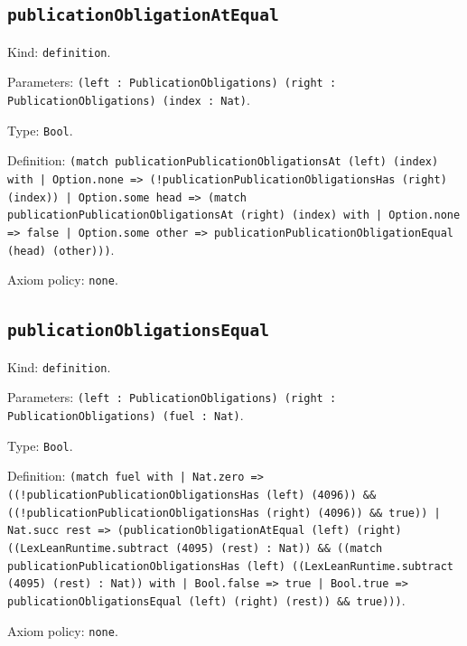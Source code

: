 \documentclass[11pt]{article}
\begin{document}
\subsection*{\texttt{publicationObligationAtEqual}}
\noindent Kind: \texttt{definition}.\par
\noindent Parameters: \texttt{(left : PublicationObligations) (right : PublicationObligations) (index : Nat)}.\par
\noindent Type: \texttt{Bool}.\par
\noindent Definition: \texttt{(match publicationPublicationObligationsAt (left) (index) with | Option.none => (!publicationPublicationObligationsHas (right) (index)) | Option.some head => (match publicationPublicationObligationsAt (right) (index) with | Option.none => false | Option.some other => publicationPublicationObligationEqual (head) (other)))}.\par
\noindent Axiom policy: \texttt{none}.\par
\subsection*{\texttt{publicationObligationsEqual}}
\noindent Kind: \texttt{definition}.\par
\noindent Parameters: \texttt{(left : PublicationObligations) (right : PublicationObligations) (fuel : Nat)}.\par
\noindent Type: \texttt{Bool}.\par
\noindent Definition: \texttt{(match fuel with | Nat.zero => ((!publicationPublicationObligationsHas (left) (4096)) \&\& ((!publicationPublicationObligationsHas (right) (4096)) \&\& true)) | Nat.succ rest => (publicationObligationAtEqual (left) (right) ((LexLeanRuntime.subtract (4095) (rest) : Nat)) \&\& ((match publicationPublicationObligationsHas (left) ((LexLeanRuntime.subtract (4095) (rest) : Nat)) with | Bool.false => true | Bool.true => publicationObligationsEqual (left) (right) (rest)) \&\& true)))}.\par
\noindent Axiom policy: \texttt{none}.\par
\end{document}
